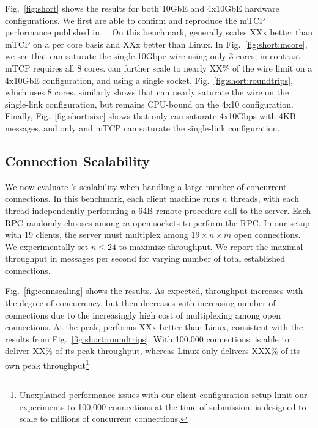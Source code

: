  Fig.~\ref{fig:short} shows the results for both
10GbE and 4x10GbE hardware configurations.  We first
are able to confirm and reproduce the mTCP performance published in
~\cite{jeong2014mtcp}.  On this benchmark, \ix generally scales XXx
better than mTCP on a per core basis and XXx better than Linux.  In
Fig.~\ref{fig:short:mcore}, we see that \ix can saturate the single
10Gbpe wire using only 3 cores; in contrast mTCP requires all 8
cores. \ix can further scale to nearly XX\% of the wire limit on a
4x10GbE configuration, and using a single socket.
Fig.~\ref{fig:short:roundtrips}, which uses 8 cores, similarly shows
that \ix can nearly saturate the wire on the single-link
configuration, but remains CPU-bound on the 4x10 configuration.
Finally, Fig.~\ref{fig:short:size} shows that only \ix can saturate
4x10Gbps with 4KB messages, and only \ix and mTCP can saturate the
single-link configuration.


\subsection{Connection Scalability}


\label{sec:eval:scale}

We now evaluate \ix's scalability when handling a large number of
concurrent connections. In this benchmark, each client machine runs
$n$ threads, with each thread independently performing a 64B remote
procedure call to the server.  Each RPC randomly chooses among $m$
open sockets to perform the RPC.  In our setup with 19 clients, the
server must multiplex among $19 \times n \times m$ open connections.
We experimentally set $n \leq 24$ to maximize throughput.  We report
the maximal throughput in messages per second for varying number of
total established connections.

Fig.~\ref{fig:connscaling} shows the results.  As expected, throughput
increases with the degree of concurrency, but then decreases with
increasing number of connections due to the increasingly high cost of
multiplexing among open connections.  At the peak, \ix performs XXx
better than Linux, consistent with the results from
Fig.~\ref{fig:short:roundtrips}.  With 100,000 connections, \ix is
able to deliver XX\% of its peak throughput, whereas Linux only
delivers XXX\% of its own peak throughput\footnote{Unexplained
  performance issues with our client configuration setup limit our
  experiments to 100,000 connections at the time of submission. \ix is
  designed to scale to millions of concurrent connections.}


